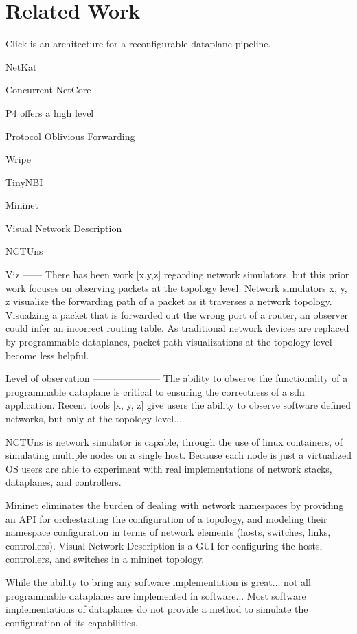 \section{Related Work}

Click \cite{click} is an architecture for a reconfigurable dataplane pipeline.

NetKat\cite{netkat}

Concurrent NetCore\cite{cnetcore}

P4\cite{p4} offers a high level

Protocol Oblivious Forwarding\cite{pof}

Wripe \cite{wripe}

TinyNBI \cite{tinynbi}

Mininet\cite{mininet}

Visual Network Description \cite{vnd}

NCTUns \cite{nctuns}

Viz
------
There has been work [x,y,z] regarding network simulators, but this prior work focuses on observing packets at the topology level. Network simulators x, y, z visualize the forwarding path of a packet as it traverses a network topology. Visualzing a packet that is forwarded out the wrong port of a router, an observer could infer an incorrect routing table. As traditional network devices are replaced by programmable dataplanes, packet path visualizations at the topology level become less helpful.

Level of observation
---------------------
The ability to observe the functionality of a programmable dataplane is 
critical to ensuring the correctness of a sdn application. 
Recent tools [x, y, z] give users the ability to observe software defined
networks, but only at the topology level....  

NCTUns \cite{nctuns} is network simulator is capable, through the use of linux
containers, of simulating multiple nodes on a single host. Because each 
node is just a virtualized OS users are able to experiment with real 
implementations of network stacks, dataplanes, and controllers. 

Mininet \cite{mininet} eliminates the burden of dealing with network namespaces 
by providing an API for orchestrating the configuration of a topology, and 
modeling their namespace configuration in terms of network elements (hosts, 
switches, links, controllers). Visual Network Description \cite{vnd} is a 
GUI for configuring the hosts, controllers, and switches in a mininet
topology.

While the ability to bring any software implementation is great... not all
programmable dataplanes are implemented in software... Most software
implementations of dataplanes do not provide a method to simulate
the configuration of its capabilities.  
